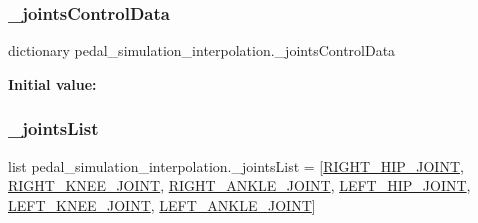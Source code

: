 \subsubsection{\texorpdfstring{\_jointsControlData}{\_jointsControlData}}
{\footnotesize\ttfamily dictionary pedal\+\_\+simulation\+\_\+interpolation.\+\_\+joints\+Control\+Data\hspace{0.3cm}{\ttfamily [private]}}

{\bfseries Initial value\+:}
\begin{DoxyCode}{0}

\end{DoxyCode}
\mbox{\label{namespacepedal__simulation__interpolation_af1999ed031f9c71cb506aab0dc8e78d3}} 
\subsubsection{\texorpdfstring{\_jointsList}{\_jointsList}}
{\footnotesize\ttfamily list pedal\+\_\+simulation\+\_\+interpolation.\+\_\+joints\+List = \mbox{[}\mbox{\hyperlink{namespacepedal__simulation__interpolation_aad473b018fcc9d9c95a44581bd61660d}{R\+I\+G\+H\+T\+\_\+\+H\+I\+P\+\_\+\+J\+O\+I\+NT}}, \mbox{\hyperlink{namespacepedal__simulation__interpolation_a61524db0cb3c7fd23db26e1bbeaeef72}{R\+I\+G\+H\+T\+\_\+\+K\+N\+E\+E\+\_\+\+J\+O\+I\+NT}}, \mbox{\hyperlink{namespacepedal__simulation__interpolation_a0e0a198975d0424914f5e43f79488cb6}{R\+I\+G\+H\+T\+\_\+\+A\+N\+K\+L\+E\+\_\+\+J\+O\+I\+NT}}, \mbox{\hyperlink{namespacepedal__simulation__interpolation_abe72d1a8edf0a9f8a038b148bc3fc0ac}{L\+E\+F\+T\+\_\+\+H\+I\+P\+\_\+\+J\+O\+I\+NT}}, \mbox{\hyperlink{namespacepedal__simulation__interpolation_a2e53d0d9efd1ff1a03e86cc61d2a67f2}{L\+E\+F\+T\+\_\+\+K\+N\+E\+E\+\_\+\+J\+O\+I\+NT}}, \mbox{\hyperlink{namespacepedal__simulation__interpolation_afe0bf24935549d42d338d73b71f0d496}{L\+E\+F\+T\+\_\+\+A\+N\+K\+L\+E\+\_\+\+J\+O\+I\+NT}}\mbox{]}\hspace{0.3cm}{\ttfamily [private]}}


